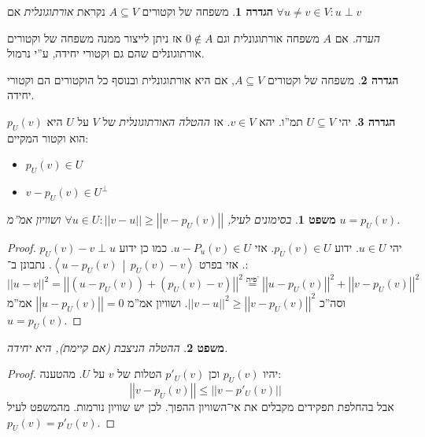 \documentclass[]{article}
\newcommand\ra    {\rangle}
\newcommand\la    {\langle}
\newcommand\co        {\colon}
\newtheorem{Theorem}{משפט}
\theoremstyle{definition}
\newtheorem{definition}{הגדרה}
\newcommand\theo  [1] {\begin{Theorem}#1\end{Theorem}}
\newcommand\defi  [1] {\begin{definition}#1\end{definition}}
\newcommand\norm[1]   {\left \vert \left \vert #1 \right \vert \right \vert}
\newcommand\mut[2]    {\left \la #1 \,\middle\vert\, #2 \right \ra}
\begin{document}
    \defi{משפחה של וקטורים $A \subseteq V$ נקראת \textit{אורתוגונלית} אם $\forall u \neq v \in V\co u \perp v$}
    \textit{הערה. }אם $A$ משפחה אורתוגונלית וגם $0 \notin A$ אז ניתן לייצור ממנה משפחה של וקטורים אורתוגונלים שהם גם וקטורי יחידה, ע''י נרמול. \\
    
    \defi{משפחה של וקטורים $A \subseteq V$, אם היא אורתוגונלית ובנוסף כל הוקטורים הם וקטורי יחידה. }
    
    \defi{יהי $U \subseteq V$ תמ''ו. יהא $v \in V$. אז \textit{ההטלה האורתוגונלית} של $V$ על $U$ היא $p_U(v)$ הוא וקטור המקיים: 
    \begin{itemize}
        \item \hfil $p_U(v) \in U$ 
        \item \hfil $v - p_U(v) \in U^\perp$
    \end{itemize}}
    \theo{בסימונים לעיל, $\forall u \in U \co \norm{v - u} \ge \norm{v - p_U(v)}$ ושוויון אמ''מ $u = p_U(v)$. }
    
    \begin{proof}
        יהי $u \in U$. ידוע $p_U(v) \in U$. אזי $u - P_u(v) \in U$. כמו כן ידוע $p_U(v) - v \perp u$. אזי בפרט $\mut{u - p_U(v)}{p_U(v) - v}$. נתבונן ב־: 
        \[ \norm{u - v}^2 = \norm{(u - p_U(v)) + (p_U(v) - v)}^2 \overset{\text{פית'}}{=} \norm{u - p_U(v)}^2 + \norm{v - p_U(v)}^2 \]
        וסה''כ $\norm{v - u}^2 \ge \norm{v - p_U(v)}^2$. ושוויון אמ''מ $\norm{u- p_U(v)} = 0$ אמ''מ $u  = p_U(v)$. 
    \end{proof}
    \theo{ההטלה הניצבת (אם קיימת), היא יחידה. }\begin{proof}
        יהיו $p_U(v)$ וכן $p'_U(v)$ הטלות של $v$ על $U$. מהטענה: 
        \[ \norm{v - p_U(v)} \le \norm{v - p'_U(v)} \]
        אבל בהחלפת תפקידים מקבלים את אי־השוויון ההפוך. לכן יש שוויון נורמות. מהמשפט לעיל $p_U(v) = p'_U(v)$. 
    \end{proof}
    
\end{document}
